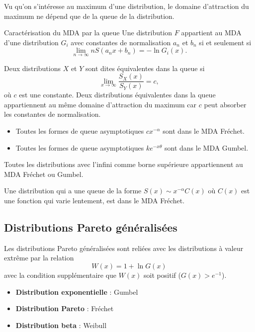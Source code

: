Vu qu'on s'intéresse au maximum d'une distribution, le domaine d'attraction du maximum ne dépend que de la queue de la distribution. 

\begin{theoreme}{Caractérisation du MDA par la queue}{}
	Une distribution $F$ appartient au MDA d'une distribution $G_i$ avec constantes de normalisation $a_n$ et $b_n$ si et seulement si 
	$$\lim\limits_{n\to \infty} nS(a_n x + b_n) = -\ln G_i(x).$$
\end{theoreme}

Deux distributions $X$ et $Y$ sont dites équivalentes dans la queue si 
$$\lim\limits_{x\to \infty} \frac{S_X(x)}{S_Y(x)} = c,$$
où $c$ est une constante. Deux distributions équivalentes dans la queue appartiennent au même domaine d'attraction du maximum car $c$ peut absorber les constantes de normalisation. 

\begin{itemize}
	\item Toutes les formes de queue asymptotiques $cx^{-\alpha}$ sont dans le MDA Fréchet. 
	\item Toutes les formes de queue asymptotiques $ke^{-x\theta}$ sont dans le MDA Gumbel. 
\end{itemize}

Toutes les distributions avec l'infini comme borne supérieure appartiennent au MDA Fréchet ou Gumbel.

\begin{theoreme}{}{}
	Une distribution qui a une queue de la forme $S(x) \sim x^{-\alpha} C(x)$ où $C(x)$ est une fonction qui varie lentement, est dans le MDA Fréchet. 
\end{theoreme}

\subsection{Distributions Pareto généralisées}

Les distributions Pareto généralisées sont reliées avec les distributions à valeur extrême par la relation 
$$W(x) = 1 + \ln G(x)$$
avec la condition supplémentaire que $W(x)$ soit positif ($G(x) > e^{-1}$).

\begin{itemize}
	\item \textbf{Distribution exponentielle} : Gumbel 
	\item \textbf{Distribution Pareto} : Fréchet
	\item \textbf{Distribution beta} : Weibull
\end{itemize}

